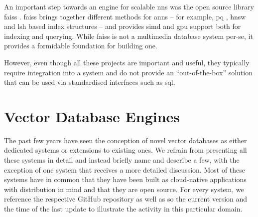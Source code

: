 An important step towards an engine for scalable \acrshort{nns} was the open source library \acrfull{faiss} \cite{Johnson:2019Billion}. \acrshort{faiss} brings together different methods for \acrshort{anns} -- for example, \acrshort{pq} \cite{Jegou:2010Product}, \acrshort{hnsw} \cite{Malkov:2018Efficient} and \acrshort{lsh} \cite{Indyk1998:Approximate} based index structures -- and provides  \acrshort{simd} and \acrshort{gpu} support both for indexing and querying. While \acrshort{faiss} is not a multimedia database system per-se, it provides a formidable foundation for building one.

However, even though all these projects are important and useful, they typically require integration into a system and do not provide an ``out-of-the-box'' solution that can be used via standardised interfaces such as \acrshort{sql}.

\section{Vector Database Engines}
\label{section:vector_databases}
The past few years have seen the conception of novel vector databases as either dedicated systems or extensions to existing ones. We refrain from presenting all these systems in detail and instead briefly name and describe a few, with the exception of one system that receives a more detailed discussion. Most of these systems have in common that they have been built as cloud-native applications with distribution in mind and that they are open source. For every system, we reference the respective GitHub repository as well as so the current version and the time of the last update to illustrate the activity in this particular domain.

